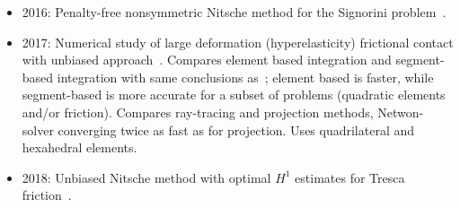 \documentclass[12pt]{article}
\begin{document}
\begin{itemize}
\item 2016: Penalty-free nonsymmetric Nitsche method for the Signorini problem~\cite{burman2016free}.
\item 2017: Numerical study of large deformation (hyperelasticity) frictional contact with unbiased approach~\cite{MLIKA2017selfcontact}. Compares element based integration and segment-based integration with same conclusions as~\cite{Farah2015integration}; element based is faster, while segment-based is more accurate for a subset of problems (quadratic elements and/or friction).
Compares ray-tracing and projection methods, Netwon-solver converging twice as fast as for projection. Uses quadrilateral and hexahedral elements.
\item 2018: Unbiased Nitsche method with optimal $H^1$ estimates for Tresca friction~\cite{chouly2018unbiased}.
\end{itemize}



\printbibliography
\end{document}
